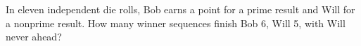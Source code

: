 In eleven independent die rolls, Bob earns a point for a prime result and Will for a nonprime result. How many winner sequences finish Bob 6, Will 5, with Will never ahead?
